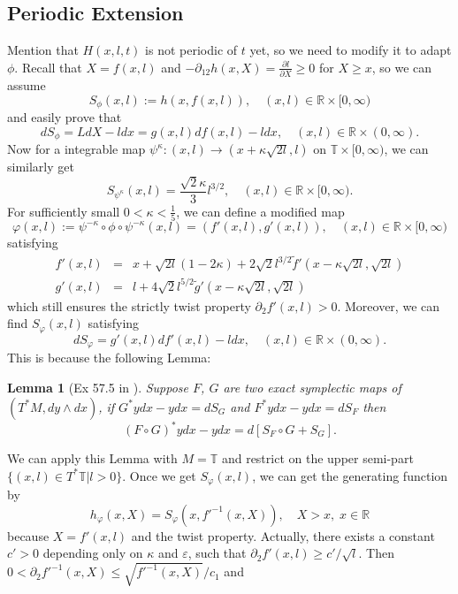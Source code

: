 \documentclass{amsart}
\newtheorem{lem}[thm]{Lemma}
\begin{document}
\subsection{Periodic Extension}Mention that $H(x,l,t)$ is not periodic of $t$ yet, so we need to modify it to adapt $\phi$.
Recall that $X=f(x,l)$ and $-\partial_{12}h(x,X)=\frac{\partial l}{\partial X}\geq0$ for $X\geq x$, so we can assume 
\[
S_\phi(x,l):=h(x,f(x,l)),\quad(x,l)\in{\mathbb{R}}\times[0,\infty)
\]
and easily prove that
\[
dS_\phi=LdX-ldx=g(x,l)df(x,l)-ldx,\quad(x,l)\in{\mathbb{R}}\times(0,\infty). 
\]
 Now for a integrable map $\psi^\kappa:(x,l)\rightarrow (x+\kappa \sqrt{2l},l)$ on ${\mathbb{T}}\times[0,\infty)$, we can similarly
get
\[
S_{\psi^\kappa}(x,l)=\frac{\sqrt{2}\kappa}{3}l^{3/2},\quad(x,l)\in{\mathbb{R}}\times[0,\infty).
\]
For sufficiently small $0<\kappa<\frac{1}{5}$, we can define a modified map 
\begin{equation}\label{H'}
\varphi(x,l):=\psi^{-\kappa}\circ\phi\circ\psi^{-\kappa}(x,l)=(f'(x,l),g'(x,l)),\quad(x,l)\in{\mathbb{R}}\times[0,\infty)
\end{equation}
satisfying
\begin{eqnarray}
f'(x,l)&=&x+\sqrt{2l}(1-2\kappa)+2\sqrt{2}l^{3/2}\tilde{f}'(x-\kappa\sqrt{2l},\sqrt{2l})\nonumber\\
g'(x,l)&=&l+4\sqrt{2}l^{5/2}\tilde{g}'(x-\kappa\sqrt{2l},\sqrt{2l})
\end{eqnarray}
which still ensures the strictly twist property $\partial_2 f'(x,l)>0$. Moreover, we can find $S_{\varphi}(x,l)$
satisfying 
\begin{equation}\label{extension}
dS_\varphi=g'(x,l)df'(x,l)-ldx,\quad(x,l)\in{\mathbb{R}}\times(0,\infty).
\end{equation}
This is because the following Lemma:
\begin{lem}[Ex 57.5 in \cite{G}]
Suppose $F$, $G$ are two exact symplectic maps of $(T^*M,dy\wedge dx)$, if $G^*ydx- ydx= dS_G$ and $F^*ydx-ydx= dS_F$  then
\[
(F\circ G)^*ydx-ydx=d [S_F\circ G+S_G].
\]
\end{lem}
We can apply this Lemma with $M={\mathbb{T}}$ and restrict on the upper semi-part $\{(x,l)\in T^*{\mathbb{T}}|l>0\}$. Once we get $S_{\varphi}(x,l)$, we can get the generating function by
\[
h_\varphi(x,X)=S_\varphi(x,f'^{-1}(x,X)),\quad X>x,\;x\in{\mathbb{R}}
\]
because $X=f'(x,l)$ and the twist property. Actually, there exists a constant $c'>0$ depending only on $\kappa$ and ${\varepsilon}$, such that $\partial_2f'(x,l)\geq c'/\sqrt{l}$. Then $0<\partial_2f'^{-1}(x,X)\leq\sqrt{f'^{-1}(x,X)}/c_1$ and 
\end{document}
